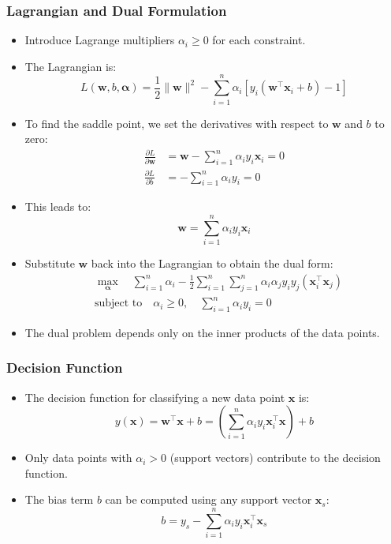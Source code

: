 \documentclass{article}
\begin{document}
\subsubsection{Lagrangian and Dual Formulation}

\begin{itemize}
    \item Introduce Lagrange multipliers $\alpha_i \geq 0$ for each constraint.
    \item The Lagrangian is:
    \[
    L(\mathbf{w}, b, \boldsymbol{\alpha}) = \frac{1}{2} \|\mathbf{w}\|^2 - \sum_{i=1}^n \alpha_i [y_i (\mathbf{w}^\top \mathbf{x}_i + b) - 1]
    \]
    \item To find the saddle point, we set the derivatives with respect to $\mathbf{w}$ and $b$ to zero:
    \[
    \begin{aligned}
    \frac{\partial L}{\partial \mathbf{w}} &= \mathbf{w} - \sum_{i=1}^n \alpha_i y_i \mathbf{x}_i = 0 \\
    \frac{\partial L}{\partial b} &= -\sum_{i=1}^n \alpha_i y_i = 0
    \end{aligned}
    \]
    \item This leads to:
    \[
    \mathbf{w} = \sum_{i=1}^n \alpha_i y_i \mathbf{x}_i
    \]
    \item Substitute $\mathbf{w}$ back into the Lagrangian to obtain the dual form:
    \[
    \begin{aligned}
    & \max_{\boldsymbol{\alpha}} \quad \sum_{i=1}^n \alpha_i - \frac{1}{2} \sum_{i=1}^n \sum_{j=1}^n \alpha_i \alpha_j y_i y_j (\mathbf{x}_i^\top \mathbf{x}_j) \\
    & \text{subject to} \quad \alpha_i \geq 0, \quad \sum_{i=1}^n \alpha_i y_i = 0
    \end{aligned}
    \]
    \item The dual problem depends only on the inner products of the data points.
\end{itemize}

\subsubsection{Decision Function}

\begin{itemize}
    \item The decision function for classifying a new data point $\mathbf{x}$ is:
    \[
    y(\mathbf{x}) = \mathbf{w}^\top \mathbf{x} + b = \left( \sum_{i=1}^n \alpha_i y_i \mathbf{x}_i^\top \mathbf{x} \right) + b
    \]
    \item Only data points with $\alpha_i > 0$ (support vectors) contribute to the decision function.
    \item The bias term $b$ can be computed using any support vector $\mathbf{x}_s$:
    \[
    b = y_s - \sum_{i=1}^n \alpha_i y_i \mathbf{x}_i^\top \mathbf{x}_s
    \]
\end{itemize}
\end{document}
